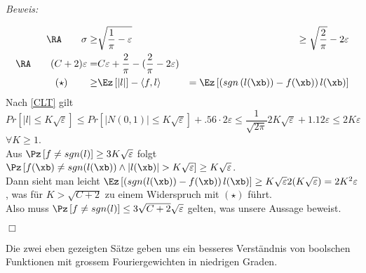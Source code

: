 \documentclass{article}
\newenvironment{proof}{
	\textit{Beweis: \\}
}{
	\begin{flushright}
		$\Box$ 
	\end{flushright}
}
\begin{document}
\begin{satz}
\begin{proof}
\begin{eqnarray*}
		\RA \qquad \sigma \ge &\sqrt{\frac{1}{\pi}-\varepsilon}&\ge \sqrt{\frac{2}{\pi}}-2\varepsilon \\
		\RA \qquad (C+2) \varepsilon =& C\varepsilon+\frac{2}{\pi} -(\frac{2}{\pi}-2\varepsilon)&\\
		(\star) \qquad \ge &  \Ez \left[ \left| l\right|\right] - \left\langle f,l \right\rangle & = \Ez\left[\left(sgn\left(l(\xb)\right)-f(\xb)\right)l(\xb)\right]
\end{eqnarray*}
		Nach \ref{CLT} gilt
		\[ 
		Pr[\left|l\right|\le K \sqrt{\varepsilon} ] \le Pr[ | N(0, 1) | \le K\sqrt{\varepsilon} ] +.56 \cdot2 \varepsilon \le \frac{1}{\sqrt{2\pi}}2K \sqrt{\varepsilon} + 1.12 \varepsilon \le 2K \varepsilon 
		\] 
		$\forall K\ge 1$.\\
		Aus $\Pz \left[f \neq sgn(l) \right] \ge 3 K \sqrt{\varepsilon}$ folgt $\Pz \left[f(\xb ) \neq sgn(l(\xb)) \wedge \left|l(\xb)\right|> K \sqrt{\varepsilon}\right] \ge K\sqrt{\varepsilon}$.\\
		Dann sieht man leicht $ \Ez\left[\left( sgn ( l( \xb))-f(\xb) \right) l( \xb)\right]  \ge K \sqrt{\varepsilon} 2(K \sqrt{\varepsilon})=2K^2 \varepsilon$, was f\"ur $K > \sqrt{C+2}$ zu einem Widerspruch mit $(\star)$ f\"uhrt.\\
		Also muss $\Pz \left[f \neq sgn(l) \right] \le 3 \sqrt{C+2} \sqrt{\varepsilon}$ gelten, was unsere Aussage beweist.
	 \end{proof}
	 	 \end{satz}
	 	 Die zwei eben gezeigten S\"atze geben uns ein besseres Verst\"andnis von boolschen Funktionen mit grossem Fouriergewichten in niedrigen Graden.
	 	 \newpage
	 	 
	 	 
\end{document}
